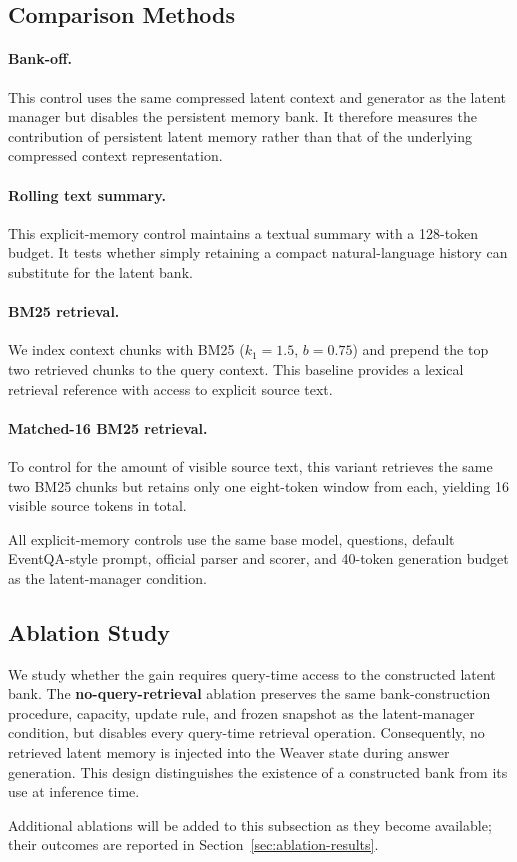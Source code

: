 \subsection{Comparison Methods}

\paragraph{Bank-off.} This control uses the same compressed latent context and generator as the latent manager but disables the persistent memory bank.  It therefore measures the contribution of persistent latent memory rather than that of the underlying compressed context representation.

\paragraph{Rolling text summary.} This explicit-memory control maintains a textual summary with a 128-token budget.  It tests whether simply retaining a compact natural-language history can substitute for the latent bank.

\paragraph{BM25 retrieval.} We index context chunks with BM25 ($k_1=1.5$, $b=0.75$) and prepend the top two retrieved chunks to the query context.  This baseline provides a lexical retrieval reference with access to explicit source text.

\paragraph{Matched-16 BM25 retrieval.} To control for the amount of visible source text, this variant retrieves the same two BM25 chunks but retains only one eight-token window from each, yielding 16 visible source tokens in total.

All explicit-memory controls use the same base model, questions, default EventQA-style prompt, official parser and scorer, and 40-token generation budget as the latent-manager condition.

\subsection{Ablation Study}
\label{sec:ablation-study}

We study whether the gain requires query-time access to the constructed latent bank.  The \textbf{no-query-retrieval} ablation preserves the same bank-construction procedure, capacity, update rule, and frozen snapshot as the latent-manager condition, but disables every query-time retrieval operation.  Consequently, no retrieved latent memory is injected into the Weaver state during answer generation.  This design distinguishes the existence of a constructed bank from its use at inference time.

Additional ablations will be added to this subsection as they become available; their outcomes are reported in Section~\ref{sec:ablation-results}.
